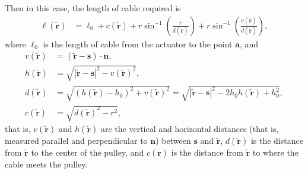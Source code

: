 \documentclass[reqno,12pt]{amsart}
\begin{document}
Then in this case, the length of cable required is
\begin{equation}
\label{example ell}
\begin{aligned}
\ell(\tilde{\bm r}) &= \ell_0 + c(\tilde{\bm r})
+ r \sin^{-1} \left(\frac{r}{d(\tilde{\bm r})} \right)
+ r \sin^{-1} \left(\frac{v(\tilde{\bm r})}{d(\tilde{\bm r})} \right) 
,
\end{aligned}
\end{equation}
where $\ell_0$ is the length of cable from the actuator to the point $\bm a$, and
\begin{align}
v(\tilde{\bm r}) &= (\tilde{\bm r} - \bm s) \cdot \bm n ,\\
h(\tilde{\bm r}) &= \sqrt{|\tilde{\bm r} - \bm s|^2 - v(\tilde{\bm r})^2}, \\
d(\tilde{\bm r}) &= \sqrt{(h(\tilde{\bm r}) - h_0)^2 + v(\tilde{\bm r})^2} = \sqrt{|\tilde{\bm r} - \bm s|^2 - 2 h_0 h(\tilde{\bm r}) + h_0^2} ,
\\
c(\tilde{\bm r}) &= \sqrt{d(\tilde{\bm r})^2 - r^2} ,
\end{align}
that is,
$v(\tilde{\bm r})$ and $h(\tilde{\bm r})$ are the vertical and horizontal distances (that is, measured parallel and perpendicular to $\bm n$) between $\bm s$ and $\tilde{\bm r}$,
$d(\tilde{\bm r})$ is the distance from $\tilde{\bm r}$ to the center of the pulley, and $c(\tilde{\bm r})$ is the distance from $\tilde{\bm r}$ to where the cable meets the pulley.
\end{document}
